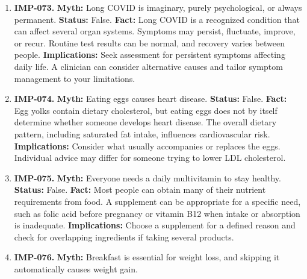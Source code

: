\documentclass[11pt,oneside]{book}
\begin{document}
\begin{enumerate}[leftmargin=0pt,labelwidth=0pt,labelsep=0pt,itemindent=0pt]
\textbf{Status:} False.\newline
\textbf{Fact:} Genetic modification describes a method used to introduce a trait. Food safety depends on the particular product, including its composition and potential allergens. The method alone does not establish that a food is unsafe. \cite{ref57}\newline
\textbf{Implications:} Evaluate a concern about a specific food or trait against the evidence for that product.
\item[] \textbf{IMP-073.} \textbf{Myth:} Long COVID is imaginary, purely psychological, or always permanent.\newline
\textbf{Status:} False.\newline
\textbf{Fact:} Long COVID is a recognized condition that can affect several organ systems. Symptoms may persist, fluctuate, improve, or recur. Routine test results can be normal, and recovery varies between people. \cite{ref422}\newline
\textbf{Implications:} Seek assessment for persistent symptoms affecting daily life. A clinician can consider alternative causes and tailor symptom management to your limitations.
\item[] \textbf{IMP-074.} \textbf{Myth:} Eating eggs causes heart disease.\newline
\textbf{Status:} False.\newline
\textbf{Fact:} Egg yolks contain dietary cholesterol, but eating eggs does not by itself determine whether someone develops heart disease. The overall dietary pattern, including saturated fat intake, influences cardiovascular risk. \cite{ref10}\newline
\textbf{Implications:} Consider what usually accompanies or replaces the eggs. Individual advice may differ for someone trying to lower LDL cholesterol.
\item[] \textbf{IMP-075.} \textbf{Myth:} Everyone needs a daily multivitamin to stay healthy.\newline
\textbf{Status:} False.\newline
\textbf{Fact:} Most people can obtain many of their nutrient requirements from food. A supplement can be appropriate for a specific need, such as folic acid before pregnancy or vitamin B12 when intake or absorption is inadequate. \cite{ref20}\newline
\textbf{Implications:} Choose a supplement for a defined reason and check for overlapping ingredients if taking several products.
\item[] \textbf{IMP-076.} \textbf{Myth:} Breakfast is essential for weight loss, and skipping it automatically causes weight gain.\newline

\end{enumerate}
\end{document}
